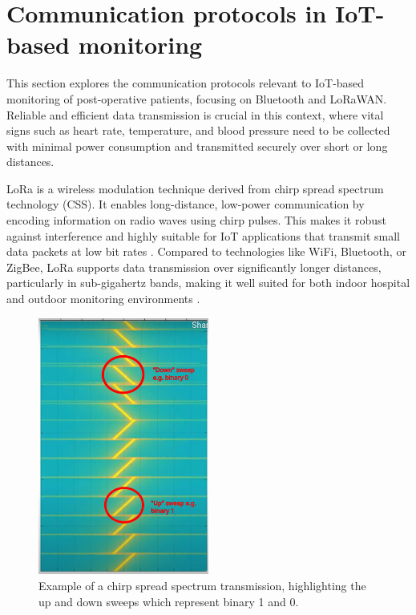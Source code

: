 \section{Communication protocols in IoT-based monitoring} %
This section explores the communication protocols relevant to IoT-based monitoring of post-operative patients, focusing on Bluetooth and LoRaWAN. Reliable and efficient data transmission is crucial in this context, where vital signs such as heart rate, temperature, and blood pressure need to be collected with minimal power consumption and transmitted securely over short or long distances.

LoRa is a wireless modulation technique derived from chirp spread spectrum technology (CSS). It enables long-distance, low-power communication by encoding information on radio waves using chirp pulses. This makes it robust against interference and highly suitable for IoT applications that transmit small data packets at low bit rates \cite{what_are_lora_lorawan}. Compared to technologies like WiFi, Bluetooth, or ZigBee, LoRa supports data transmission over significantly longer distances, particularly in sub-gigahertz bands, making it well suited for both indoor hospital and outdoor monitoring environments \cite{lora_documentation}.

\begin{figure}[H]
\centering
\includegraphics[width=0.5\textwidth]{images/chirp_spread_spectrum_labeled}
\caption{Example of a chirp spread spectrum transmission, highlighting the up and down sweeps which represent binary 1 and 0. \cite{Wenner2017_hd}}
\label{fig:chirp_spread_spectrum_labeled}
\end{figure}

